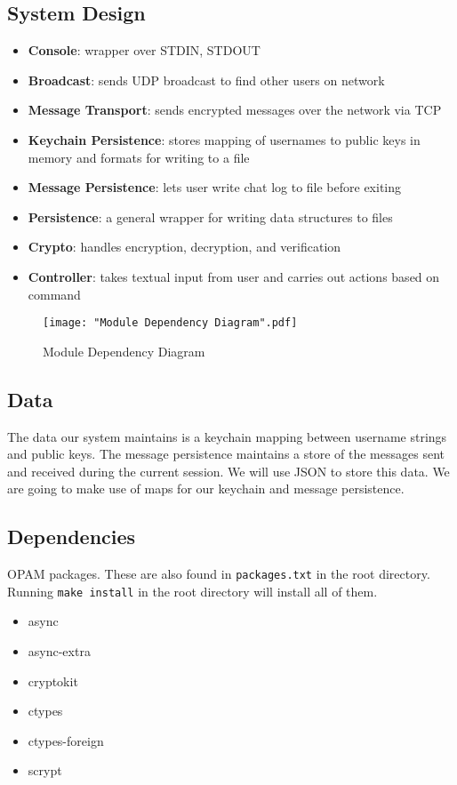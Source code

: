\documentclass{scrartcl}
\begin{document}
\subsection{System Design}
\begin{itemize}
	\item \textbf{Console}: wrapper over STDIN, STDOUT
	\item \textbf{Broadcast}: sends UDP broadcast to find other users on network
	\item \textbf{Message Transport}: sends encrypted messages over the network via TCP
	\item \textbf{Keychain Persistence}: stores mapping of usernames to public keys in memory and formats for writing to a file
	\item \textbf{Message Persistence}: lets user write chat log to file before exiting
	\item \textbf{Persistence}: a general wrapper for writing data structures to files
	\item \textbf{Crypto}: handles encryption, decryption, and verification
	\item \textbf{Controller}: takes textual input from user and carries out actions based on command
\end{itemize}
\begin{figure}[H]
	\texttt{[image: "Module Dependency Diagram".pdf]}
	\caption{Module Dependency Diagram}
\end{figure}
\subsection{Data}

The data our system maintains is a keychain mapping between username strings and public keys. The message persistence maintains a store of the messages sent and received during the current session. We will use JSON to store this data. We are going to make use of maps for our keychain and message persistence.

\subsection{Dependencies}

OPAM packages. These are also found in  \texttt{packages.txt} in the root directory. Running \texttt{make install} in the root directory will install all of them.

\begin{itemize}
    \item async
    \item async-extra
    \item cryptokit
    \item ctypes
    \item ctypes-foreign
    \item scrypt
\end{itemize}
\end{document}
